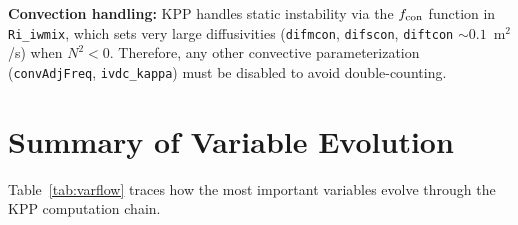 \documentclass[12pt,letterpaper]{article}
\begin{document}
\begin{warnbox}  
\textbf{Convection handling:} KPP handles static instability via the  
$f_{\rm con}$ function in \texttt{Ri\_iwmix}, which sets very large  
diffusivities (\texttt{difmcon}, \texttt{difscon}, \texttt{diftcon}  
$\sim 0.1$~m$^2$/s) when $N^2 < 0$. Therefore, any other convective  
parameterization (\texttt{convAdjFreq}, \texttt{ivdc\_kappa}) must  
be disabled to avoid double-counting.  
\end{warnbox}  
  
\section{Summary of Variable Evolution}  
  
Table~\ref{tab:varflow} traces how the most important variables evolve  
through the KPP computation chain.  
  
\end{document}
